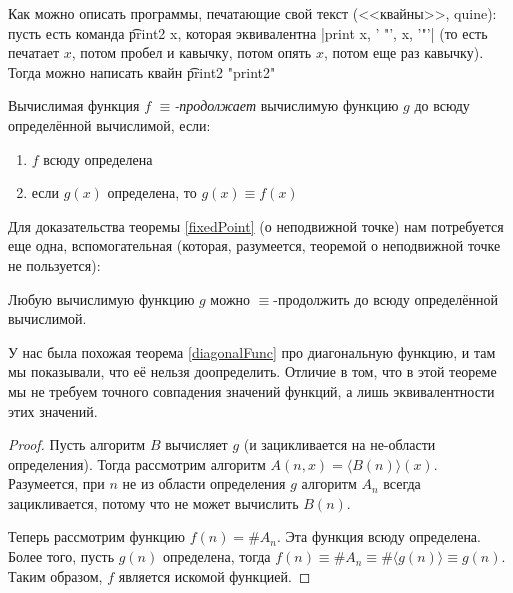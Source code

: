 \begin{Rem}
	Как можно описать программы, печатающие свой текст (<<квайны>>, quine): пусть есть команда \t{print2 x}, которая
	эквивалентна \python|print x, ' "', x, '"'| (то есть печатает $x$, потом пробел и кавычку, потом опять $x$, потом еще раз кавычку).
	Тогда можно написать квайн \t{print2 "print2"}
\end{Rem}

\begin{Def}
	Вычислимая функция $f$ \textit{$\equiv$-продолжает} вычислимую функцию $g$ до всюду определённой вычислимой, если:
	\begin{enumerate}
	\item $f$ всюду определена
	\item если $g(x)$ определена, то $g(x) \equiv f(x)$
	\end{enumerate}
\end{Def}


\label{fixedPointProof}
Для доказательства теоремы \ref{fixedPoint} (о неподвижной точке) нам потребуется еще одна, вспомогательная
(которая, разумеется, теоремой о неподвижной точке не пользуется):
\begin{theorem}\label{equivFuncExtend}
	Любую вычислимую функцию $g$ можно $\equiv$-продолжить до всюду определённой вычислимой.
\end{theorem}
\begin{Rem}
	У нас была похожая теорема \ref{diagonalFunc} про диагональную функцию, и там мы показывали, что её нельзя доопределить.
	Отличие в том, что в этой теореме мы не требуем точного совпадения значений функций, а лишь эквивалентности этих значений.
\end{Rem}
\begin{proof}
	Пусть алгоритм $B$ вычисляет $g$ (и зацикливается на не-области определения).
	Тогда рассмотрим алгоритм $A(n, x)=\langle B(n) \rangle(x)$.
	Разумеется, при $n$ не из области определения $g$ алгоритм $A_n$ всегда зацикливается, потому что не может вычислить $B(n)$.

	Теперь рассмотрим функцию $f(n) = \# A_n$.
	Эта функция всюду определена.
	Более того, пусть $g(n)$ определена, тогда $f(n) \equiv \# A_n \equiv \# \langle g(n) \rangle \equiv g(n)$.
	Таким образом, $f$ является искомой функцией.
\end{proof}

